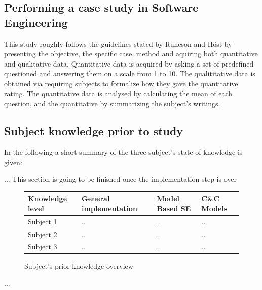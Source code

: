 \subsection{Performing a case study in Software Engineering}

This study roughly follows the guidelines stated by Runeson and Höst \cite{CaseStudyGuidelines} by presenting the objective, the specific case, method and aquiring both quantitative and qualitative data. Quantitative data is acquired by asking a set of predefined questioned and answering them on a scale from 1 to 10. The qualititative data is obtained via requiring subjects to formalize how they gave the quantitative rating.
The quantitative data is analysed by calculating the mean of each question, and the quantitative by summarizing the subject's writings. 


\subsection{Subject knowledge prior to study}
In the following a short summary of the three subject's state of knowledge is given:

... This section is going to be finished once the implementation step is over


\begin{figure}[!h]
	\centering
\begin{tabular}{ l l l l}
Knowledge level & General implementation  & Model Based SE & C\&C Models\\
\hline
Subject 1 & .. & .. & .. \\
Subject 2 & .. & .. & .. \\
Subject 3 & .. & .. & .. \\
\end{tabular}
	\caption{Subject's prior knowledge overview}
	\label{table:priorKnowledge}
\end{figure}

...

